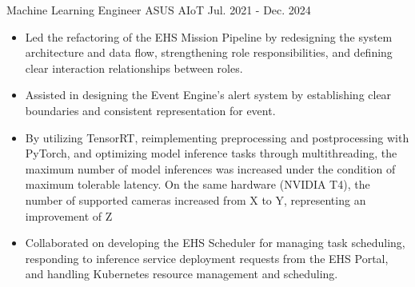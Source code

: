 

\begin{cventries}


  \cventrynew
    {Machine Learning Engineer} %
    {ASUS AIoT} %
    {Jul. 2021 - Dec. 2024} %
    {
        \begin{cvitems} %
          \begin{itemize}
              \item Led the refactoring of the EHS Mission Pipeline by redesigning the system architecture and data flow, strengthening role responsibilities, 
              and defining clear interaction relationships between roles.
              \item Assisted in designing the Event Engine’s alert system by establishing clear boundaries and consistent representation for event.
          \end{itemize}
          \begin{itemize}
              \item By utilizing TensorRT, reimplementing preprocessing and postprocessing with PyTorch, and optimizing model inference tasks through multithreading, 
              the maximum number of model inferences was increased under the condition of maximum tolerable latency. On the same hardware (NVIDIA T4), 
              the number of supported cameras increased from X to Y, representing an improvement of Z%
          \end{itemize}
          \begin{itemize}
              \item Collaborated on developing the EHS Scheduler for managing task scheduling, 
              responding to inference service deployment requests from the EHS Portal, and handling Kubernetes resource management and scheduling.
          \end{itemize}

\end{cvitems}}
\end{cventries}
